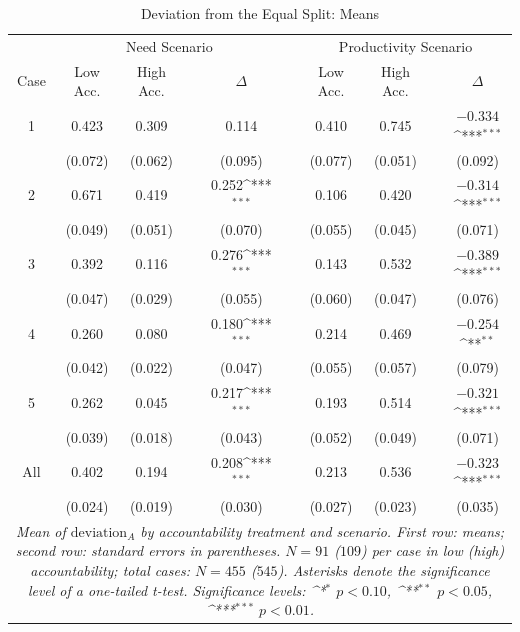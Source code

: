 \documentclass[smallcondensed]{svjour3}
\begin{document}
\begin{table}
\centering
\caption{Deviation from the Equal Split: Means}\label{tab:dev_means}
{\footnotesize
\def\sym#1{\ifmmode^{#1}\else\(^{#1}\)\fi}
\begin{tabularx}{12.5cm}{cccccccccc}\hline
             &\multicolumn{4}{c}{Need Scenario}                 &   & \multicolumn{4}{c}{Productivity Scenario}          \\\cline{2-5}\cline{7-10}
   Case      & Low Acc.   & High Acc.   &   & $\Delta$          &   & Low Acc.   & High Acc.   &   & $\Delta$            \\\hline\hline
   1         &  0.423     &  0.309      &   &  0.114            &   &  0.410     &  0.745      &   & $-0.334$\sym{***}   \\
             & (0.072)    & (0.062)     &   & (0.095)           &   & (0.077)    & (0.051)     &   & (0.092)             \\
   2         &  0.671     &  0.419      &   &  0.252\sym{***}   &   &  0.106     &  0.420      &   & $-0.314$\sym{***}   \\
             & (0.049)    & (0.051)     &   & (0.070)           &   & (0.055)    & (0.045)     &   & (0.071)             \\
   3         &  0.392     &  0.116      &   &  0.276\sym{***}   &   &  0.143     &  0.532      &   & $-0.389$\sym{***}   \\
             & (0.047)    & (0.029)     &   & (0.055)           &   & (0.060)    & (0.047)     &   & (0.076)             \\
   4         &  0.260     &  0.080      &   &  0.180\sym{***}   &   &  0.214     &  0.469      &   & $-0.254$\sym{**}    \\
             & (0.042)    & (0.022)     &   & (0.047)           &   & (0.055)    & (0.057)     &   & (0.079)             \\
   5         &  0.262     &  0.045      &   &  0.217\sym{***}   &   &  0.193     &  0.514      &   & $-0.321$\sym{***}   \\
             & (0.039)    & (0.018)     &   & (0.043)           &   & (0.052)    & (0.049)     &   & (0.071)             \\
   All       &  0.402     &  0.194      &   &  0.208\sym{***}   &   &  0.213     &  0.536      &   & $-0.323$\sym{***}   \\
             & (0.024)    & (0.019)     &   & (0.030)           &   & (0.027)    & (0.023)     &   & (0.035)             \\\hline
\multicolumn{10}{p{12.25cm}}{\footnotesize\textit{Mean of $\mbox{deviation}_A$ by accountability treatment and scenario. First row: means; second row: standard errors in parentheses. $N=91$ ($109$) per case in low (high) accountability; total cases: $N=455$ ($545$). Asterisks denote the significance level of a one-tailed t-test. Significance levels: \sym{*} \(p<0.10\), \sym{**} \(p<0.05\), \sym{***} \(p<0.01\).}}
\end{tabularx}
}
\end{table}
%
\end{document}
